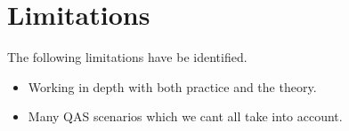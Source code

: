 
\section{Limitations}

The following limitations have be identified.

\begin{itemize}
    \item Working in depth  with  both practice and the theory.
    \item Many QAS scenarios which we cant all take into account. 
\end{itemize}


